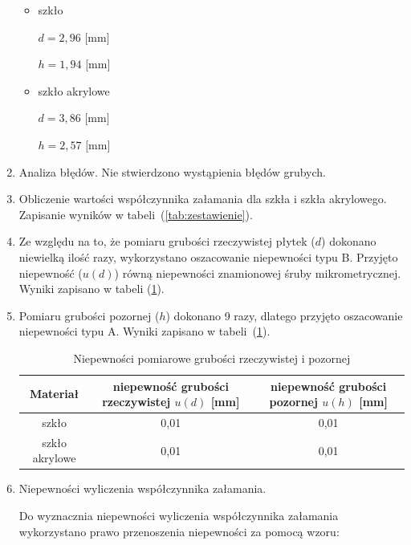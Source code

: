 \documentclass [a4paper,11pt]{article}
\begin{document}
\begin{enumerate}[label=\alph*)]
		\begin{itemize}
			\item szkło
			
				$d=2,96 \text{ [mm]}$ 
				
				$h=1,94 \text{ [mm]}$ 
			\item szkło akrylowe
			
				$d=3,86 \text{ [mm]}$ 
				
				$h=2,57 \text{ [mm]}$
				
		\end{itemize}
		
		\item Analiza błędów.
		Nie stwierdzono wystąpienia błędów grubych.
		
		\item Obliczenie wartości współczynnika załamania dla szkła i szkła akrylowego. Zapisanie wyników w tabeli~(\ref{tab:zestawienie}).
		
		\item Ze względu na to, że pomiaru grubości rzeczywistej płytek ($d$) dokonano niewielką ilość razy, wykorzystano oszacowanie niepewności typu B. Przyjęto niepewność ($u(d)$) równą niepewności znamionowej śruby mikrometrycznej. Wyniki zapisano w tabeli (\ref{tab:niephd}).
		
		\item Pomiaru grubości pozornej ($h$) dokonano 9 razy, dlatego przyjęto oszacowanie niepewności typu A. Wyniki zapisano w tabeli~(\ref{tab:niephd}).
		
		\begin{table}[!h]
			\caption{Niepewności pomiarowe grubości rzeczywistej i pozornej}
			\label{tab:niephd}
			\begin{center}
				\begin{tabular}{|c|c|c|}
					\hline Materiał & niepewność grubości rzeczywistej $u(d)$ [mm] & niepewność grubości pozornej $u(h)$ [mm] \\
					\hline szkło & 0,01 & 0,01 \\
					\hline szkło akrylowe & 0,01 & 0,01 \\
					\hline 
				\end{tabular} 
			\end{center}
		\end{table}
		
		\item Niepewności wyliczenia współczynnika załamania.
		
		Do wyznacznia niepewności wyliczenia współczynnika załamania wykorzystano prawo przenoszenia niepewności za pomocą wzoru:
		

\end{enumerate}
\end{document}
